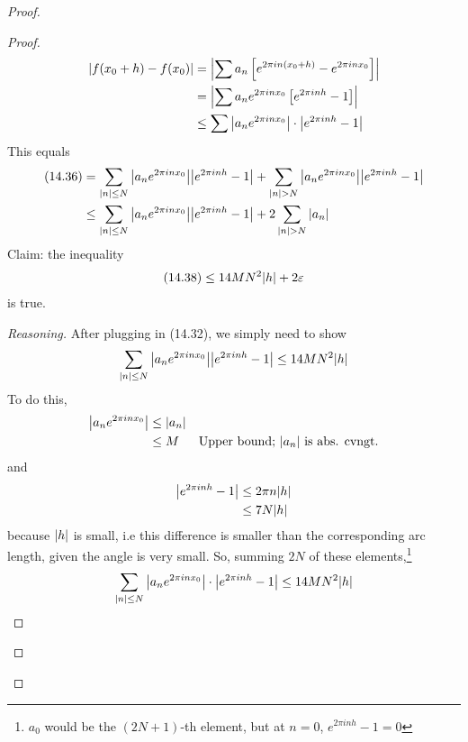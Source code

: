 \begin{proof}
\begin{enumerate}
\begin{proof}
\begin{align}
                \abs{f(x_0 + h) - f(x_0)} &= \abs{\sum a_n \left[ e^{2\pi in (x_0 + h)} - e^{2\pi in x_0} \right]}\\
                &= \abs{\sum a_n e^{2\pi in x_0} \left[ e^{2\pi in h} - 1 \right]}\\
                &\le \sum \abs{a_n e^{2\pi in x_0}} \cdot \abs{ e^{2\pi in h} - 1}
            \end{align}
            This equals
            \begin{align}
                (14.36) &= \sum_{\abs{n} \le N} \abs{a_n e^{2\pi in x_0}} \abs{ e^{2\pi in h} - 1} + \sum_{\abs{n} > N} \abs{a_n e^{2\pi in x_0}} \abs{ e^{2\pi in h} - 1}\\
                &\le \sum_{\abs{n} \le N} \abs{a_n e^{2\pi in x_0}} \abs{ e^{2\pi in h} - 1} + 2\sum_{\abs{n} > N} \abs{a_n}
            \end{align}
            Claim: the inequality
            \begin{align}
                (14.38) \le 14MN^2\abs{h} + 2\varepsilon
            \end{align}
            is true.
            \begin{proof}[Reasoning]
                After plugging in (14.32), we simply need to show
                \begin{align}
                    \sum_{\abs{n} \le N} \abs{a_n e^{2\pi in x_0}} \abs{ e^{2\pi in h} - 1} \le 14MN^2\abs{h}
                \end{align}
                To do this,
                \begin{align}
                    \abs{a_n e^{2\pi in x_0}} &\le \abs{a_n}\\
                    &\le M & \text{Upper bound; $\abs{a_n}$ is abs. cvngt.}
                \end{align}
                and
                \begin{align}
                    \abs{ e^{2\pi in h} - 1} &\le 2\pi n \abs{h}\\
                    &\le 7 N \abs{h}
                \end{align}
                because $\abs{h}$ is small, i.e this difference is smaller than the corresponding arc length, given the angle is very small. So, summing $2N$ of these elements,\footnote{$a_0$ would be the $(2N+1)$-th element, but at $n = 0$, $e^{2\pi in h} - 1 = 0$}
                \begin{align}
                    \sum_{\abs{n} \le N} \abs{a_n e^{2\pi in x_0}} \cdot \abs{ e^{2\pi in h} - 1} \le 14MN^2\abs{h}

\end{align}
\end{proof}
\end{proof}
\end{enumerate}
\end{proof}
